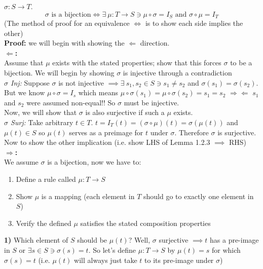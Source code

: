 \begin{lemma}
$\sigma :S \rightarrow T$.
\begin{equation}
    \sigma \text{ is a bijection} \iff \exists \ \mu: T\rightarrow S \ni \mu\circ \sigma = I_S \text{ and } \sigma\circ \mu = I_T\nonumber
\end{equation}
(The method of proof for an equivalence $\Leftrightarrow$ is to show each side implies the other)\steezybreak\\
\textbf{Proof:} we will begin with showing the $\Leftarrow$ direction.\\
\textbf{$\Leftarrow$:} \\Assume that $\mu$ exists with the stated properties; show that this forces $\sigma$ to be a bijection. We will begin by showing $\sigma$ is injective through a contradiction \steezybreak\\
\textit{$\sigma$ Inj:} Suppose $\sigma$ is not injective $\implies \exists \ s_1,s_2\in S \ni s_1\neq s_2$ and $\sigma(s_1)=\sigma(s_2)$. But we know $\mu \circ \sigma = I_s$ which means $\mu\circ \sigma (s_1) = \mu\circ \sigma(s_2) = s_1=s_2$ $\Rightarrow\Leftarrow$ $s_1$ and $s_2$ were assumed non-equal!! So $\sigma$ must be injective.\steezybreak\\
Now, we will show that $\sigma$ is also surjective if such a $\mu$ exists.\steezybreak\\
\textit{$\sigma$ Surj:} Take arbitrary $t\in T$. $t= I_T(t)= (\sigma\circ\mu)(t)=\sigma(\mu(t))$ and $\mu(t)\in S$ so $\mu(t)$ serves as a preimage for $t$ under $\sigma$. Therefore $\sigma$ is surjective. \\ 

\noindent Now to show the other implication (i.e. show LHS of Lemma 1.2.3 $\implies$ RHS) \\
\textbf{$\Rightarrow$:} \\ We assume $\sigma$ is a bijection, now we have to:
\begin{enumerate}
    \item Define a rule called $\mu:T\rightarrow S$
    \item Show $\mu$ is a mapping (each element in $T$ should go to exactly one element in $S$)
    \item Verify the defined $\mu$ satisfies the stated composition properties
\end{enumerate}
\textbf{1)} Which element of $S$ should be $\mu(t)$? Well, $\sigma$ surjective $\implies t$ has a pre-image in $S$ or $\exists s\in S \ni \sigma(s)=t$. So let's define $ \mu: T\rightarrow S$ by $\mu(t)=s$ for which $\sigma(s)=t$ (i.e. $\mu(t)$ will always just take $t$ to its pre-image under $\sigma$)\steezybreak\\


\end{lemma}
